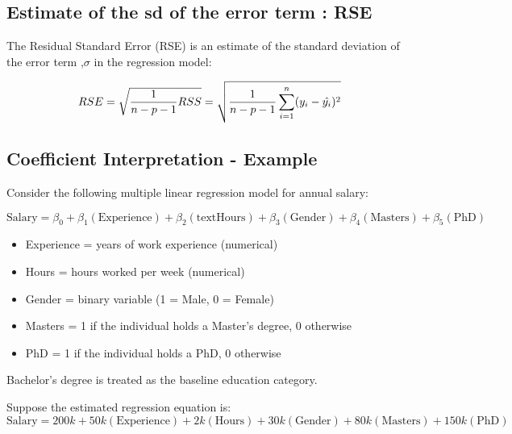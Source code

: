 \documentclass[10pt,a4paper]{article}
\begin{document}
	\subsection{Estimate of the sd of the error term : RSE}
	The Residual Standard Error (RSE) is an estimate of the standard deviation of the error term ,$\sigma$
	in the regression model:

	\begin{align*}
			\Large RSE = \sqrt{\frac{1}{n-p-1}RSS} = \sqrt{\frac{1}{n-p-1} \sum_{i=1}^{n} (y_i-\hat{y_i})^2}
	\end{align*}


	\subsection{Coefficient Interpretation - Example}

	Consider the following multiple linear regression model for annual salary:

	\[
	\text{Salary} = \beta_0 + \beta_1(\text{Experience}) + \beta_2(\text{textHours}) + \beta_3(\text{Gender}) + \beta_4(\text{Masters}) + \beta_5(\text{PhD})
	\]
	\begin{itemize}
		\item Experience = years of work experience (numerical)
		\item Hours = hours worked per week (numerical)
		\item Gender = binary variable (1 = Male, 0 = Female)
		\item Masters = 1 if the individual holds a Master's degree, 0 otherwise
		\item PhD = 1 if the individual holds a PhD, 0 otherwise
	\end{itemize}

	Bachelor's degree is treated as the baseline education category.

	Suppose the estimated regression equation is:
	\[
	\text{Salary} = 200k + 50k(\text{Experience}) + 2k(\text{Hours}) + 30k(\text{Gender}) + 80k(\text{Masters}) + 150k(\text{PhD})
	\]
\end{document}
